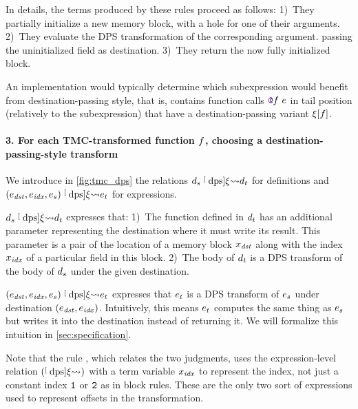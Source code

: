 In details, the terms produced by these rules proceed as follows:
1)~They partially initialize a new memory block, with a hole for one of their arguments.
2)~They evaluate the DPS transformation of the corresponding argument.
   passing the uninitialized field as destination.
3)~They return the now fully initialized block.

An implementation would typically determine which subexpression would benefit from destination-passing style, that is, contains function calls $\datalangCall {\datalangFnptr \datalangFn} \datalangExpr$ in tail position (relatively to the subexpression) that have a destination-passing variant $\datalangRenaming [\datalangFn]$.


\paragraph{3. For each TMC-transformed function $\datalangFn$, choosing a destination-passing-style transform}
We introduce in \cref{fig:tmc_dps} the relations $\datalangDef_s \tmcDps{\datalangRenaming} \datalangDef_t$ for definitions and $(\datalangExpr_\mathit{dst}, \datalangExpr_\mathit{idx}, \datalangExpr_s) \tmcDps{\datalangRenaming} \datalangExpr_t$ for expressions.

$\datalangDef_s \tmcDps{\datalangRenaming} \datalangDef_t$ expresses that:
1)~The function defined in $\datalangDef_t$ has an additional parameter representing the destination where it must write its result. This parameter is a pair of the location of a memory block $\datalangVar_\mathit{dst}$ along with the index $\datalangVar_\mathit{idx}$ of a particular field in this block.
2)~The body of $\datalangDef_t$ is a DPS transform of the body of $\datalangDef_s$ under the given destination.

$(\datalangExpr_\mathit{dst}, \datalangExpr_\mathit{idx}, \datalangExpr_s) \tmcDps{\datalangRenaming} \datalangExpr_t$ expresses that $\datalangExpr_t$ is a DPS transform of $\datalangExpr_s$ under destination $(\datalangExpr_\mathit{dst}, \datalangExpr_\mathit{idx})$.
Intuitively, this means $\datalangExpr_t$ computes the same thing as $\datalangExpr_s$ but writes it into the destination instead of returning it.
We will formalize this intuition in \cref{sec:specification}.

Note that the rule , which relates the two judgments, uses the expression-level relation $(\mathrel{\stackrel[\scriptscriptstyle\textrm{dps}]{ \xi }{ \rightsquigarrow }})$ with a term variable $\datalangVar_\mathit{idx}$ to represent the index, not just a constant index $\texttt{1}$ or $\texttt{2}$ as in block rules. These are the only two sort of expressions used to represent offsets in the transformation.

